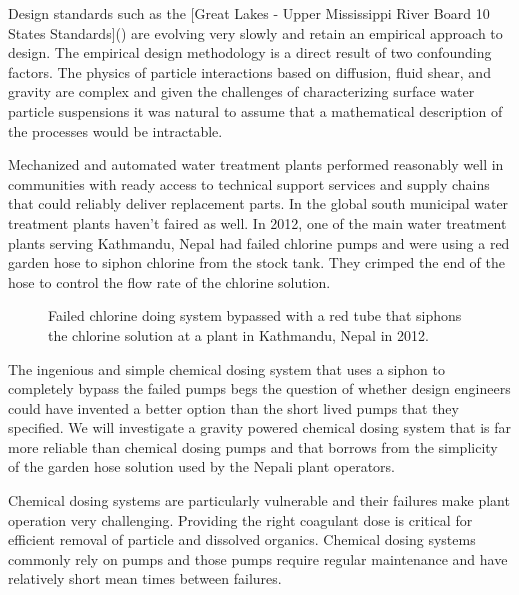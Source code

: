 \documentclass[letterpaper,10pt,english]{sphinxmanual}
\let\sphinxpxdimen\pdfpxdimen\else\newdimen\sphinxpxdimen
\begin{document}
Design standards such as the {[}Great Lakes - Upper Mississippi River Board 10 States Standards{]}() are evolving very slowly and retain an empirical approach to design. The empirical design methodology is a direct result of two confounding factors. The physics of particle interactions based on diffusion, fluid shear, and gravity are complex and given the challenges of characterizing surface water particle suspensions it was natural to assume that a mathematical description of the processes would be intractable.

Mechanized and automated water treatment plants performed reasonably well in communities with ready access to technical support services and supply chains that could reliably deliver replacement parts. In the global south municipal water treatment plants haven’t faired as well. In 2012, one of the main water treatment plants serving Kathmandu, Nepal had failed chlorine pumps and were using a red garden hose to siphon chlorine from the stock tank. They crimped the end of the hose to control the flow rate of the chlorine solution.

\begin{figure}[htbp]
\centering
\capstart

\noindent\sphinxincludegraphics[width=300\sphinxpxdimen]{{Kathmandu_chemical_feed_room}.png}
\caption{Failed chlorine doing system bypassed with a red tube that siphons the chlorine solution at a plant in Kathmandu, Nepal in 2012.}\label{\detokenize{Introduction/Introduction:id16}}\label{\detokenize{Introduction/Introduction:figure-kathmandu-chemical-feed-room}}\end{figure}

The ingenious and simple chemical dosing system that uses a siphon to completely bypass the failed pumps begs the question of whether design engineers could have invented a better option than the short lived pumps that they specified. We will investigate a gravity powered chemical dosing system that is far more reliable than chemical dosing pumps and that borrows from the simplicity of the garden hose solution used by the Nepali plant operators.

Chemical dosing systems are particularly vulnerable and their failures make plant operation very challenging. Providing the right coagulant dose is critical for efficient removal of particle and dissolved organics. Chemical dosing systems commonly rely on pumps and those pumps require regular maintenance and have relatively short mean times between failures.
\end{document}
